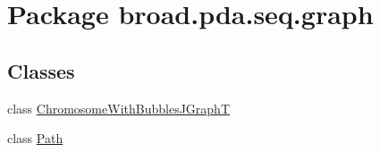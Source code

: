 \hypertarget{namespacebroad_1_1pda_1_1seq_1_1graph}{\section{Package broad.\+pda.\+seq.\+graph}
\label{namespacebroad_1_1pda_1_1seq_1_1graph}
}
\subsection*{Classes}
\begin{DoxyCompactItemize}
\item 
class \hyperlink{classbroad_1_1pda_1_1seq_1_1graph_1_1_chromosome_with_bubbles_j_graph_t}{Chromosome\+With\+Bubbles\+J\+Graph\+T}
\item 
class \hyperlink{classbroad_1_1pda_1_1seq_1_1graph_1_1_path}{Path}
\end{DoxyCompactItemize}
